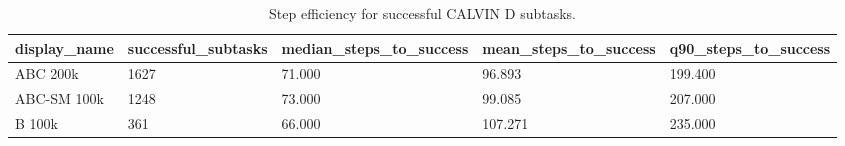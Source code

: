 \begin{table}[t]
\centering
\caption{Step efficiency for successful CALVIN D subtasks.}
\label{tab:task3-steps-to-success}
\begin{tabular}{lllll}
\toprule
display\_name & successful\_subtasks & median\_steps\_to\_success & mean\_steps\_to\_success & q90\_steps\_to\_success \\
\midrule
ABC 200k & 1627 & 71.000 & 96.893 & 199.400 \\
ABC-SM 100k & 1248 & 73.000 & 99.085 & 207.000 \\
B 100k & 361 & 66.000 & 107.271 & 235.000 \\
\bottomrule
\end{tabular}
\end{table}
